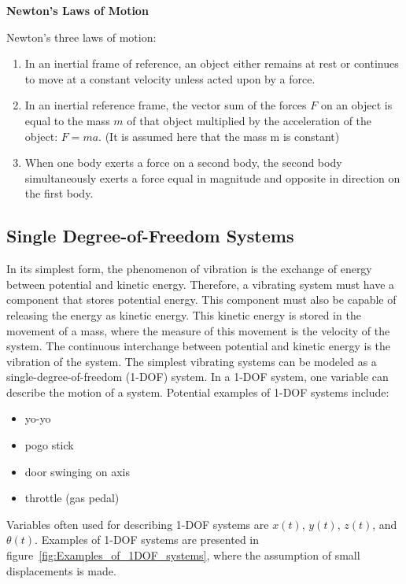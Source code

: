 \documentclass[12pt,letter]{article}
\begin{document}
 \begin{review}

  \textbf{Newton's Laws of Motion}

  \noindent Newton's three laws of motion:
  \begin{enumerate}
   \item In an inertial frame of reference, an object either remains at rest or continues to move at a constant velocity unless acted upon by a force.
   \item In an inertial reference frame, the vector sum of the forces $F$ on an object is equal to the mass $ m$ of that object multiplied by the acceleration of the object: $F = ma$. (It is assumed here that the mass m is constant)
   \item When one body exerts a force on a second body, the second body simultaneously exerts a force equal in magnitude and opposite in direction on the first body.
  \end{enumerate}
 \end{review}

 \subsection{Single Degree-of-Freedom Systems}
 
        In its simplest form, the phenomenon of vibration is the exchange of energy between potential and kinetic energy. Therefore, a vibrating system must have a component that stores potential energy. This component must also be capable of releasing the energy as kinetic energy. This kinetic energy is stored in the movement of a mass, where the measure of this movement is the velocity of the system. The continuous interchange between potential and kinetic energy is the vibration of the system. The simplest vibrating systems can be modeled as a single-degree-of-freedom (1-DOF) system. In a 1-DOF system, one variable can describe the motion of a system. Potential examples of 1-DOF systems include:
  \begin{itemize}
   \item yo-yo
   \item pogo stick
   \item door swinging on axis
   \item throttle (gas pedal)
  \end{itemize}
    

  Variables often used for describing 1-DOF systems are $x(t)$,  $y(t)$,  $z(t)$, and  $\theta(t)$.  Examples of 1-DOF systems are presented in figure~\ref{fig:Examples_of_1DOF_systems}, where the assumption of small displacements is made. 
\end{document}
